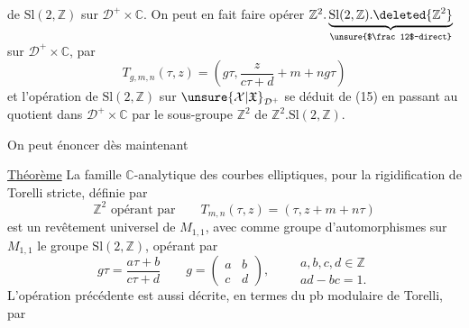 de $\mathrm{Sl}(2,\mathbb Z)$ sur $\mathcal D^+\times\mathbb C$. On peut en fait
faire opérer $\mathbb Z^2.\underbrace{\mathrm{Sl}(2,\mathbb Z).\deleted{\mathbb Z^2}}_{\text{\unsure{$\frac12$-direct}}}$
sur $\mathcal D^+\times\mathbb C$,
par
\[
T_{g,m,n}(\tau,z)=\left(g\tau,\frac z{c\tau+d}+m+ng\tau\right)
\tag{15}
\]
et l'opération  de $\mathrm{Sl}(2,\mathbb Z)$ sur
$\unsure{\mathcal X|\mathfrak X}_{\mathcal D^+}$ se déduit de (15) en passant au
quotient  dans $\mathcal D^+\times\mathbb C$ par le sous-groupe
$\mathbb Z^2$ de $\mathbb Z^2.\mathrm{Sl}(2,\mathbb Z)$.

On peut énoncer dès maintenant

\uline{Théorème} La famille $\mathbb C$-analytique des courbes
elliptiques,   pour la rigidification de Torelli
stricte, définie par
\[
\mathbb Z^2\text{ opérant par}\qquad
T_{m,n}(\tau,z)=(\tau,z+m+n\tau)
\]
est un revêtement universel de $M_{1,1}$, avec
comme groupe d'automorphismes sur $M_{1,1}$
le groupe $\mathrm{Sl}(2,\mathbb Z)$, opérant par
\[
g\tau=\frac{a\tau+b}{c\tau+d}
\qquad
g=\begin{pmatrix}a&b\\c&d\end{pmatrix},
\qquad
\begin{gathered}
a,b,c,d\in\mathbb Z\\
ad-bc=1.
\end{gathered}
\]
L'opération précédente est aussi décrite, en
termes du pb modulaire de Torelli, par
